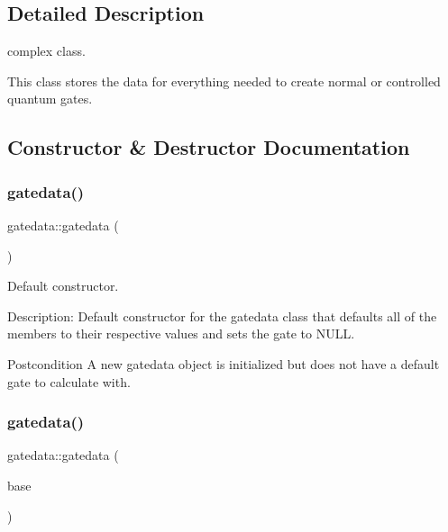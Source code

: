 \subsection{Detailed Description}
complex class. 

This class stores the data for everything needed to create normal or controlled quantum gates. 

\subsection{Constructor \& Destructor Documentation}
\mbox{\label{classgatedata_aa0a4c028ee7d4a4c48751e8a513cb948}} 
\subsubsection{\texorpdfstring{gatedata()}{gatedata()}\hspace{0.1cm}{\footnotesize\ttfamily [1/3]}}
{\footnotesize\ttfamily gatedata\+::gatedata (\begin{DoxyParamCaption}{ }\end{DoxyParamCaption})}



Default constructor. 

Description\+: Default constructor for the gatedata class that defaults all of the members to their respective values and sets the gate to N\+U\+LL. \begin{DoxyPostcond}{Postcondition}
A new gatedata object is initialized but does not have a default gate to calculate with. 
\end{DoxyPostcond}
\mbox{\label{classgatedata_afdcaaf74830567350d29308b79d80063}} 
\subsubsection{\texorpdfstring{gatedata()}{gatedata()}\hspace{0.1cm}{\footnotesize\ttfamily [2/3]}}
{\footnotesize\ttfamily gatedata\+::gatedata (\begin{DoxyParamCaption}\item[{const \hyperlink{classnTrix}{n\+Trix}$<$ \hyperlink{gatedata_8h_a0c9667bfe3ded0fa2cd4fab281edbe24}{cpf} $>$}]{base }\end{DoxyParamCaption})}



